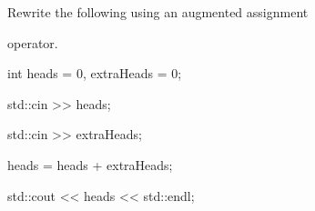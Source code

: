 Rewrite the following using an augmented assignment

operator.

\begin{console}

int heads = 0, extraHeads = 0;

std::cin >> heads;

std::cin >> extraHeads;

heads = heads + extraHeads;

std::cout << heads << std::endl;

\end{console}

